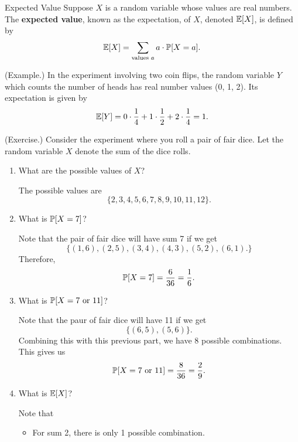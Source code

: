 \documentclass[letterpaper]{article}
\begin{document}
\begin{definition}{Expected Value}{}
    Suppose $X$ is a random variable whose values are real numbers. The \textbf{expected value}, known as the expectation, of $X$, denoted $\mathbb{E}[X]$, is defined by \[\mathbb{E}[X] = \sum_{\text{values } a} a \cdot \mathbb{P}[X = a].\]
\end{definition}

\begin{mdframed}
    (Example.) In the experiment involving two coin flips, the random variable $Y$ which counts the number of heads has real number values (0, 1, 2). Its expectation is given by 
    \[\mathbb{E}[Y] = 0 \cdot \frac{1}{4} + 1 \cdot \frac{1}{2} + 2 \cdot \frac{1}{4} = 1.\]
\end{mdframed}

\begin{mdframed}
    (Exercise.) Consider the experiment where you roll a pair of fair dice. Let the random variable $X$ denote the sum of the dice rolls. 
    \begin{enumerate}
        \item What are the possible values of $X$? 
        \begin{mdframed}
            The possible values are \[\{2, 3, 4, 5, 6, 7, 8, 9, 10, 11, 12\}.\]
        \end{mdframed}
        \item What is $\mathbb{P}[X = 7]$?
        \begin{mdframed}
            Note that the pair of fair dice will have sum 7 if we get 
            \[\{(1, 6), (2, 5), (3, 4), (4, 3), (5, 2), (6, 1).\}\]
            Therefore, 
            \[\mathbb{P}[X = 7] = \frac{6}{36} = \frac{1}{6}.\]
        \end{mdframed}
        \item What is $\mathbb{P}[X = 7 \text{ or } 11]$?
        \begin{mdframed}
            Note that the paur of fair dice will have 11 if we get 
            \[\{(6, 5), (5, 6)\}.\]
            Combining this with this previous part, we have 8 possible combinations. This gives us 
            \[\mathbb{P}[X = 7 \text{ or } 11] = \frac{8}{36} = \frac{2}{9}.\]
        \end{mdframed}
        \item What is $\mathbb{E}[X]$? 
        \begin{mdframed}
            Note that
            \begin{itemize}
                \item For sum 2, there is only 1 possible combination. 

\end{itemize}
\end{mdframed}
\end{enumerate}
\end{mdframed}
\end{document}
